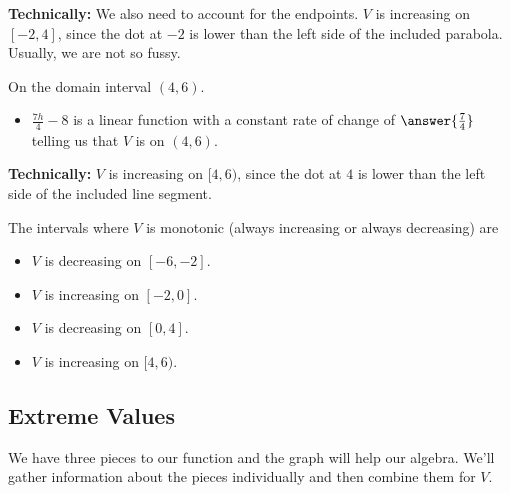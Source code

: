 \documentclass{ximera}
\begin{document}
\textbf{Technically:} We also need to account for the endpoints. $V$ is increasing on $[-2, 4]$, since the dot at $-2$ is lower than the left side of the included parabola. Usually, we are not so fussy.


\begin{question}

On the domain interval $(4, 6)$. \\

\begin{itemize}
\item \textbf{$\frac{7h}{4} - 8$} is a linear function with a constant rate of change of $\answer{\frac{7}{4}}$ telling us that $V$ is  on $(4, 6)$.
\end{itemize}
\end{question}

\textbf{Technically:} $V$ is increasing on $[4, 6)$, since the dot at $4$ is lower than the left side of the included line segment.


The intervals where $V$ is monotonic (always increasing or always decreasing) are

\begin{itemize}
\item $V$ is decreasing on $[-6,-2]$.
\item $V$ is increasing on $[-2,0]$.
\item $V$ is decreasing on $[0,4]$.
\item $V$ is increasing on $[4,6)$.
\end{itemize}


















\subsection*{Extreme Values} 


We have three pieces to our function and the graph will help our algebra. We'll gather information about the pieces individually and then combine them for $V$.
\end{document}
